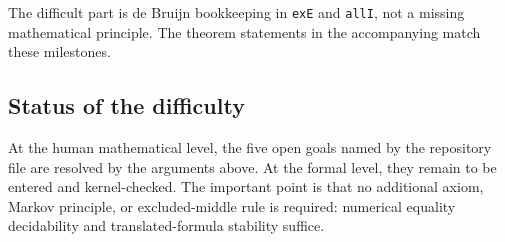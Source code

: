 The difficult part is de Bruijn bookkeeping in \texttt{exE} and \texttt{allI}, not a missing mathematical principle.  The theorem statements in the accompanying  match these milestones.

\subsection{Status of the difficulty}

At the human mathematical level, the five open goals named by the repository file are resolved by the arguments above.  At the formal level, they remain to be entered and kernel-checked.  The important point is that no additional axiom, Markov principle, or excluded-middle rule is required: numerical equality decidability and translated-formula stability suffice.
